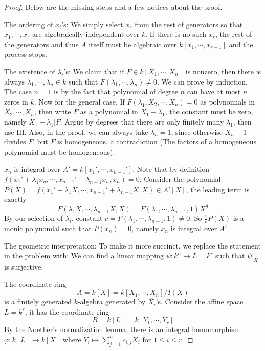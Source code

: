\documentclass{solution}
\begin{document}
\begin{proof}
    Below are the missing steps and a few notices about the proof.

    The ordering of $x_i$'s: We simply select $x_r$ from the rest of generators so that $x_1, \cdots, x_r$ are algebraically independent over $k$. If there is no such $x_r$, the rest of the generators and thus $A$ itself must be algebraic over $k[x_1, \cdots, x_{r - 1}]$ and the process stops.

    The existence of $\lambda_i$'s: We claim that if $F \in k[X_1, \cdots, X_n]$ is nonzero, then there is always $\lambda_1, \cdots, \lambda_n \in k$ such that $F(\lambda_1, \cdots, \lambda_n) \ne 0$. We can prove by induction. The case $n = 1$ is by the fact that polynomial of degree $n$ can have at most $n$ zeros in $k$. Now for the general case. If $F(\lambda_1, X_2, \cdots, X_n) = 0$ as polynomials in $X_2, \cdots, X_n$, then write $F$ as a polynomial in $X_1 - \lambda_1$, the constant must be zero, namely $X_1 - \lambda_1 | F$. Argue by degrees that there are only finitely many $\lambda_1$, then use IH. Also, in the proof, we can always take $\lambda_n = 1$, since otherwise $X_n - 1$ divides $F$, but $F$ is homogeneous, a contradiction (The factors of a homogeneous polynomial must be homogeneous).

    $x_n$ is integral over $A' = k[x_1', \cdots, x_{n - 1}']$: Note that by definition $f(x_1' + \lambda_1 x_n, \cdots, x_{n - 1}' + \lambda_{n - 1} x_n, x_n) = 0$. Consider the polynomial $P(X) = f(x_1' + \lambda_1 X, \cdots, x_{n - 1}' + \lambda_{n - 1}X, X) \in A'[X]$, the leading term is exactly
    $$F(\lambda_1 X, \cdots, \lambda_{n - 1}X, X) = F(\lambda_1, \cdots, \lambda_{n - 1}, 1) X^d$$
    By our selection of $\lambda_i$, constant $c = F(\lambda_1, \cdots, \lambda_{n - 1}, 1) \ne 0$. So $\frac{1}{c} P(X)$ is a monic polynomial such that $P(x_n) = 0$, namely $x_n$ is integral over $A'$.

    The geometric interpretation: To make it more succinct, we replace the statement in the problem with: We can find a linear mapping $\psi: k^n \rightarrow L = k^r$ such that $\psi|_X$ is surjective.
    
    The coordinate ring
    $$A = k[X] = k[X_1, \cdots, X_n] / I(X)$$
    is a finitely generated $k$-algebra generated by $\overline{X_i}$'s. Consider  the affine space $L = k^r$, it has the coordinate ring
    $$B = k[L] = k[Y_1, \cdots, Y_r]$$
    By the Noether's normalization lemma, there is an integral homomorphism $\varphi: k[L] \rightarrow k[X]$ where $Y_i \mapsto \sum\limits_{j = 1}^{n} c_{i, j} \overline{X_i}$ for $1 \le i \le r$.
    

\end{proof}
\end{document}
